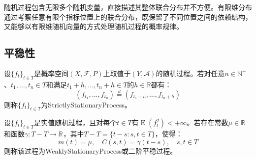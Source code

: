 随机过程包含无限多个随机变量，直接描述其整体联合分布并不方便。有限维分布通过考察任意有限个指标位置上的联合分布，既保留了不同位置之间的依赖结构，又能够以有限维随机向量的方式处理随机过程的概率规律。

\subsection{平稳性}
\begin{definition}
	设$\{f_t\}_{t\in T}$是概率空间$(X,\mathscr{F},P)$上取值于$(Y,\mathscr{A})$的随机过程。若对任意$n\in\mathbb{N}^+$、$t_1,\dots,t_n\in T$和满足$t_1+h,\dots,t_n+h\in T$的$h\in\mathbb{R}$都有：
	\begin{equation*}
		(f_{t_1},\dots,f_{t_n})\overset{d}{=}(f_{t_1+h},\dots,f_{t_n+h})
	\end{equation*}
	则称$\{f_t\}_{t\in T}$为\gls{StrictlyStationaryProcess}。
\end{definition}
\begin{definition}
	设$\{f_t\}_{t\in T}$是实值随机过程，且对每个$t\in T$有$\operatorname{E}(f_t^2)<+\infty$。若存在常数$\mu\in\mathbb{R}^{}$和函数$\gamma:T-T\to\mathbb{R}^{}$，其中$T-T=\{t-s:s,t\in T\}$，使得：
	\begin{equation*}
		m(t)=\mu,\quad C(s,t)=\gamma(t-s),\quad s,t\in T
	\end{equation*}
	则称该过程为\gls{WeaklyStationaryProcess}或二阶平稳过程。
\end{definition}